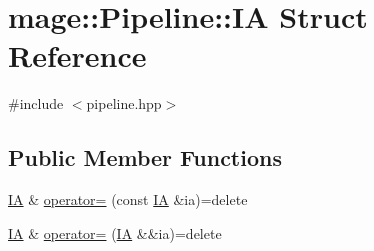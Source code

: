 \hypertarget{structmage_1_1_pipeline_1_1_i_a}{}\section{mage\+:\+:Pipeline\+:\+:IA Struct Reference}
\label{structmage_1_1_pipeline_1_1_i_a}


{\ttfamily \#include $<$pipeline.\+hpp$>$}

\subsection*{Public Member Functions}
\begin{DoxyCompactItemize}
\item 
\hyperlink{structmage_1_1_pipeline_1_1_i_a}{IA} \& \hyperlink{structmage_1_1_pipeline_1_1_i_a_ac2070e2393b41d445001998d769da904}{operator=} (const \hyperlink{structmage_1_1_pipeline_1_1_i_a}{IA} \&ia)=delete
\item 
\hyperlink{structmage_1_1_pipeline_1_1_i_a}{IA} \& \hyperlink{structmage_1_1_pipeline_1_1_i_a_a868276d459b834b11947ff4d79415ccb}{operator=} (\hyperlink{structmage_1_1_pipeline_1_1_i_a}{IA} \&\&ia)=delete
\end{DoxyCompactItemize}
